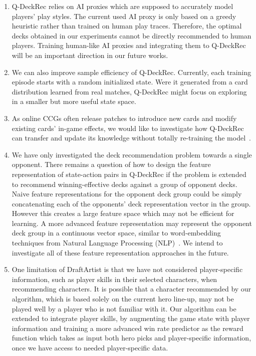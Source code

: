 \begin{enumerate}
\item Q-DeckRec relies on AI proxies which are supposed to accurately model players' play styles. The current used AI proxy is only based on a greedy heuristic rather than trained on human play traces. Therefore, the optimal decks obtained in our experiments cannot be directly recommended to human players. Training human-like AI proxies and integrating them to Q-DeckRec will be an important direction in our future works. 

\item We can also improve sample efficiency of Q-DeckRec. Currently, each training episode starts with a random initialized state. Were it generated from a card distribution learned from real matches, Q-DeckRec might focus on exploring in a smaller but more useful state space. 

\item As online CCGs often release patches to introduce new cards and modify existing cards' in-game effects, we would like to investigate how Q-DeckRec can transfer and update its knowledge without totally re-training the model~\cite{taylor2009transfer}.

\item We have only investigated the deck recommendation problem towards a single opponent. There remains a question of how to design the feature representation of state-action pairs in Q-DeckRec if the problem is extended to recommend winning-effective decks against a group of opponent decks. Naive feature representations for the opponent deck group could be simply concatenating each of the opponents' deck representation vector in the group. However this creates a large feature space which may not be efficient for learning. A more advanced feature representation may represent the opponent deck group in a continuous vector space, similar to word-embedding techniques from Natural Language Processing (NLP)~\cite{mikolov2013distributed}. We intend to investigate all of these feature representation approaches in the future.

\item One limitation of DraftArtist is that we have not considered player-specific information, such as player skills in their selected characters, when recommending characters. It is possible that a character recommended by our algorithm, which is based solely on the current hero line-up, may not be played well by a player who is not familiar with it. Our algorithm can be extended to integrate player skills, by augmenting the game state with player information and training a more advanced win rate predictor as the reward function which takes as input both hero picks and player-specific information, once we have access to needed player-specific data.


\end{enumerate}
